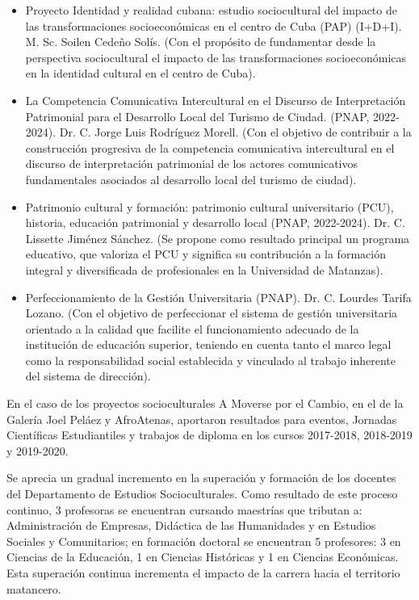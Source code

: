 \begin{itemize}
	\item Proyecto Identidad y realidad cubana: estudio sociocultural del impacto de las transformaciones socioeconómicas en el centro de Cuba (PAP) (I+D+I). M. Sc. Soilen Cedeño Solís. (Con el propósito de fundamentar desde la perspectiva sociocultural el impacto de las transformaciones socioeconómicas en la identidad cultural en el centro de Cuba).
	\item La Competencia Comunicativa Intercultural en el Discurso de Interpretación Patrimonial para el Desarrollo Local del Turismo de Ciudad. (PNAP, 2022-2024). Dr. C. Jorge Luis Rodríguez Morell. (Con el objetivo de contribuir a la construcción progresiva de la competencia comunicativa intercultural en el discurso de interpretación patrimonial de los actores comunicativos fundamentales asociados al desarrollo local del turismo de ciudad).
	\item Patrimonio cultural y formación: patrimonio cultural universitario (PCU), historia, educación patrimonial y desarrollo local (PNAP, 2022-2024). Dr. C. Lissette Jiménez Sánchez. (Se propone como resultado principal un programa educativo, que valoriza el PCU y significa su contribución a la formación integral y diversificada de profesionales en la Universidad de Matanzas).
	\item Perfeccionamiento de la Gestión Universitaria (PNAP). Dr. C. Lourdes Tarifa Lozano. (Con el objetivo de perfeccionar el sistema de gestión universitaria orientado a la calidad que facilite el funcionamiento adecuado de la institución de educación superior, teniendo en cuenta tanto el marco legal como la responsabilidad social establecida y vinculado al trabajo inherente del sistema de dirección).
\end{itemize}

En el caso de los proyectos socioculturales A Moverse por el Cambio, en el de la Galería Joel Peláez y AfroAtenas, aportaron resultados para eventos, Jornadas Científicas Estudiantiles y trabajos de diploma en los cursos 2017-2018, 2018-2019 y 2019-2020.

Se aprecia un gradual incremento en la superación y formación de los docentes del Departamento de Estudios Socioculturales. Como resultado de este proceso continuo, 3 profesoras se encuentran cursando maestrías que tributan a: Administración de Empresas, Didáctica de las Humanidades y en Estudios Sociales y Comunitarios; en formación doctoral se encuentran 5 profesores: 3 en Ciencias de la Educación, 1 en Ciencias Históricas y 1 en Ciencias Económicas. Esta superación continua incrementa el impacto de la carrera hacia el territorio matancero.

